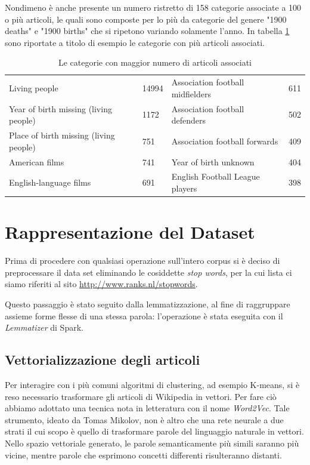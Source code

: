 \documentclass[
	11pt, %
	a4paper, %
	oneside, %
	headinclude,footinclude, %
	BCOR5mm, %
]{scrartcl}
\begin{document}
	Nondimeno è anche presente un numero ristretto di 158 categorie associate a 100 o più articoli, le quali sono composte per lo più da categorie del genere "1900 deaths" e "1900 births" che si ripetono variando solamente l'anno.
	In tabella \ref{table:toptencategories} sono riportate a titolo di esempio le categorie con più articoli associati.


	\begin{table}[]
	\vspace*{0.2cm}
	\hspace*{1cm}
	\begin{tabular}{l|l||l|l}
	Living people & 14994 & Association football midfielders & 611 \\
	Year of birth missing (living people) & 1172 & Association football defenders & 502 \\
	Place of birth missing (living people) & 751 & Association football forwards & 409 \\
	American films & 741 & Year of birth unknown & 404 \\
	English-language films & 691 & English Football League players & 398 \\
	\end{tabular}
	\caption{Le categorie con maggior numero di articoli associati}
	\label{table:toptencategories}
	\end{table}


\section{Rappresentazione del Dataset}
	Prima di procedere con qualsiasi operazione sull'intero corpus si è deciso di preprocessare il data set eliminando le cosiddette \emph{stop words}, per la cui lista ci siamo riferiti al sito \url{http://www.ranks.nl/stopwords}.

	Questo passaggio è stato seguito dalla lemmatizzazione, al fine di raggruppare assieme forme flesse di una stessa parola: l'operazione è stata eseguita con il \emph{Lemmatizer} di Spark.

	\subsection{Vettorializzazione degli articoli}
		Per interagire con i più comuni algoritmi di clustering, ad esempio K-means, si è reso necessario trasformare gli articoli di Wikipedia in vettori.
		Per fare ciò abbiamo adottato una tecnica nota in letteratura con il nome \emph{Word2Vec}. Tale strumento, ideato da Tomas Mikolov, non è altro che una rete neurale a due strati il cui scopo è quello di trasformare parole del linguaggio naturale in vettori. Nello spazio vettoriale generato, le parole semanticamente più simili saranno più vicine, mentre parole che esprimono concetti differenti risulteranno distanti.
\end{document}
